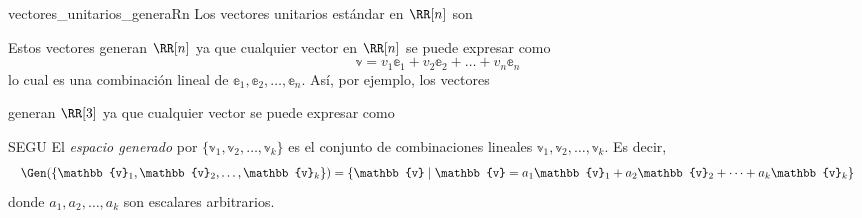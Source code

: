 \begin{examplebox}{}{vectores_unitarios_generaRn}
    Los vectores unitarios estándar en $\RR[n]$ son
    \begin{matrizn}
    \end{matrizn}
    Estos vectores generan $\RR[n]$ ya que cualquier vector en $\RR[n]$ se puede expresar como
    $$\mathbb{v} = v_1 \mathbb{e}_1 + v_2 \mathbb{e}_2 + \dots + v_n \mathbb{e}_n$$
    lo cual es una combinación lineal de $\mathbb{e}_1, \mathbb{e}_2, \dots, \mathbb{e}_n$. Así, por ejemplo, los vectores
    \begin{matrizn}
    \end{matrizn}
    generan $\RR[3]$ ya que cualquier vector se puede expresar como
    \begin{matrizn}
    \end{matrizn}
\end{examplebox}

\begin{definicion}{}{SEGU}
    El \emph{espacio generado} por $\{\mathbb{v}_1, \mathbb{v}_2, \dots, \mathbb{v}_k\}$ es el conjunto de combinaciones lineales $\mathbb{v}_1, \mathbb{v}_2, \dots, \mathbb{v}_k$. Es decir,
    $$\Gen (\{\mathbb{v}_1, \mathbb{v}_2, \dots, \mathbb{v}_k\}) = \{\mathbb{v} \mid \mathbb{v} = a_1\mathbb{v}_1 + a_2\mathbb{v}_2 + \dots + a_k\mathbb{v}_k\}$$
    donde $a_1, a_2, \dots, a_k$ son escalares arbitrarios.
\end{definicion}

